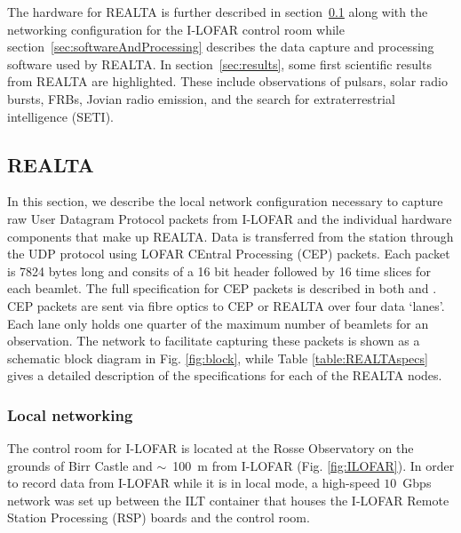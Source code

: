 The hardware for REALTA is further described in section~\ref{sec:REALTA} along with the networking configuration for the I-LOFAR control room while section~\ref{sec:softwareAndProcessing} describes the data capture and processing software used by REALTA. In section~\ref{sec:results}, some first scientific results from REALTA are highlighted. These include observations of pulsars, solar radio bursts, FRBs, Jovian radio emission, and the search for extraterrestrial intelligence (SETI).  %

\subsection{REALTA}
\label{sec:REALTA}
In this section, we describe the local network configuration necessary to capture raw User Datagram Protocol \citep[UDP;][]{Postel} packets from I-LOFAR and the individual hardware components that make up REALTA. Data is transferred from the station through the UDP protocol using LOFAR CEntral Processing (CEP) packets. Each packet is 7824 bytes long and consits of a 16 bit header followed by 16 time slices for each beamlet. The full specification for CEP packets is described in both \cite{Lubberhuizen2009} and \citet{Virtanen2018}.  CEP packets are sent via fibre optics to CEP or REALTA over four data `lanes'. Each lane only holds one quarter of the maximum number of beamlets for an observation.
The network to facilitate capturing these packets is shown as a schematic block diagram in Fig. \ref{fig:block}, while Table \ref{table:REALTAspecs} gives a detailed description of the specifications for each of the REALTA nodes. 

\subsubsection{Local networking}
\label{sec:network}
The control room for I-LOFAR is located at the Rosse Observatory on the grounds of Birr Castle and $\sim$~100~m from I-LOFAR (Fig. \ref{fig:ILOFAR}). In order to record data from I-LOFAR while it is in local mode, a high-speed $10$~Gbps network was set up between the ILT container that houses the I-LOFAR Remote Station Processing (RSP) boards and the control room.

